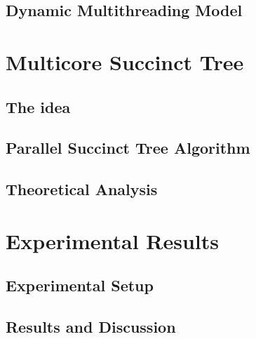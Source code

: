 \documentclass{sig-alternate}
\begin{document}
\subsection{Dynamic Multithreading Model}
\label{subsec:dym}


%


\section{Multicore Succinct Tree}
\label{sec:multicoreST}


\subsection{The idea}
\label{subsec:idea}


\subsection{Parallel Succinct Tree Algorithm}
\label{subsec:multicoreSTAlgorithm}


\subsection{Theoretical Analysis}
\label{subsec:theoreticalAnalysis}



\section{Experimental Results}
\label{sec:exps}


\subsection{Experimental Setup}
\label{subsec:experimentalSetup}


\subsection{Results and Discussion}
\label{subsec:resultsDiscussion}

\end{document}
